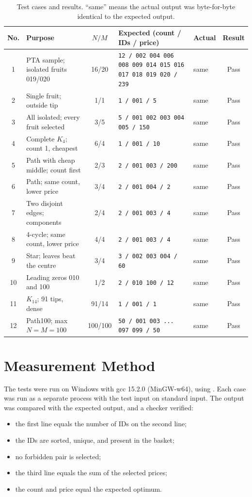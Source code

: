 \documentclass[12pt,a4paper]{report}
\newcommand{\code}[1]{\texttt{\detokenize{#1}}}
\begin{document}
\begin{table}[H]\centering\scriptsize
\setlength{\tabcolsep}{4pt}
\renewcommand{\arraystretch}{1.15}
\caption{Test cases and results.  ``same'' means the actual output was
byte-for-byte identical to the expected output.}\label{tab:tests}
\begin{tabular}{@{}c L{2.9cm} c L{4.1cm} L{4.1cm} c@{}}
\toprule
No. & Purpose & $N/M$ & Expected (count / IDs / price) & Actual & Result\\
 & PTA sample; isolated fruits 019/020 & 16/20 &
\texttt{12 / 002 004 006 008 009 014 015 016 017 018 019 020 / 239} & same & Pass\\
2 & Single fruit; outside tip & 1/1 &
\texttt{1 / 001 / 5} & same & Pass\\
3 & All isolated; every fruit selected & 3/5 &
\texttt{5 / 001 002 003 004 005 / 150} & same & Pass\\
4 & Complete $K_4$; count 1, cheapest & 6/4 &
\texttt{1 / 001 / 10} & same & Pass\\
5 & Path with cheap middle; count first & 2/3 &
\texttt{2 / 001 003 / 200} & same & Pass\\
6 & Path; same count, lower price & 3/4 &
\texttt{2 / 001 004 / 2} & same & Pass\\
7 & Two disjoint edges; components & 2/4 &
\texttt{2 / 001 003 / 4} & same & Pass\\
8 & 4-cycle; same count, lower price & 4/4 &
\texttt{2 / 001 003 / 4} & same & Pass\\
9 & Star; leaves beat the centre & 3/4 &
\texttt{3 / 002 003 004 / 60} & same & Pass\\
10 & Leading zeros 010 and 100 & 1/2 &
\texttt{2 / 010 100 / 12} & same & Pass\\
11 & $K_{14}$; 91 tips, dense & 91/14 &
\texttt{1 / 001 / 1} & same & Pass\\
12 & Path100; max $N=M=100$ & 100/100 &
\texttt{50 / 001 003 ... 097 099 / 50} & same & Pass\\
\bottomrule
\end{tabular}
\end{table}

\section{Measurement Method}

The tests were run on Windows with gcc 15.2.0 (MinGW-w64), using
\code{gcc -O2 -std=c99}.  Each case was run as a separate process with the test
input on standard input.  The output was compared with the expected output, and
a checker verified:
\begin{itemize}
\item the first line equals the number of IDs on the second line;
\item the IDs are sorted, unique, and present in the basket;
\item no forbidden pair is selected;
\item the third line equals the sum of the selected prices;
\item the count and price equal the expected optimum.
\end{itemize}
\end{document}
